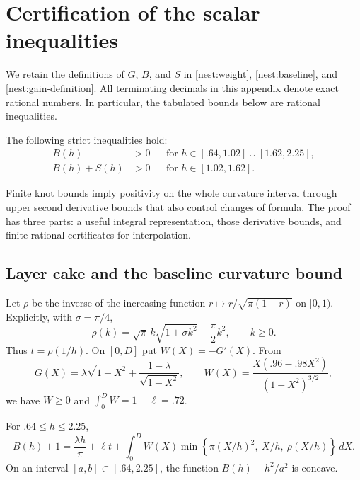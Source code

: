 \section{Certification of the scalar inequalities}
\label{num:section}

We retain the definitions of $G$, $B$, and $S$ in
\eqref{nest:weight}, \eqref{nest:baseline}, and
\eqref{nest:gain-definition}. All terminating decimals in this appendix
denote exact rational numbers. In particular, the tabulated bounds below
are rational inequalities.

\begin{proposition}\label{num:scalar-positive}
The following strict inequalities hold:
\begin{align*}
 B(h)&>0 &&\text{for }h\in[.64,1.02]\cup[1.62,2.25],\\
 B(h)+S(h)&>0 &&\text{for }h\in[1.02,1.62].
\end{align*}
\end{proposition}

Finite knot bounds imply positivity on the whole curvature interval
through upper second derivative bounds that also control changes of formula.
The proof has three parts: a useful integral representation, those
derivative bounds, and finite rational certificates for interpolation.

\subsection{Layer cake and the baseline curvature bound}

Let $\rho$ be the inverse of the increasing function
$r\mapsto r/\sqrt{\pi(1-r)}$ on $[0,1)$. Explicitly, with $\sigma=\pi/4$,
\begin{equation}\label{num:rho}
 \rho(k)=\sqrt\pi\,k\sqrt{1+\sigma k^2}-\frac\pi2 k^2,
 \qquad k\ge0.
\end{equation}
Thus $t=\rho(1/h)$. On $[0,D]$ put $W(X)=-G'(X)$. From
\begin{equation}\label{num:weight-density}
 G(X)=\lambda\sqrt{1-X^2}+\frac{1-\lambda}{\sqrt{1-X^2}},
 \qquad
 W(X)=\frac{X(.96-.98X^2)}{(1-X^2)^{3/2}},
\end{equation}
we have $W\ge0$ and $\int_0^D W=1-\ell=.72$.

\begin{lemma}\label{num:layer-cake}
For $.64\le h\le2.25$,
\begin{equation}\label{num:layer-cake-formula}
 B(h)+1=\frac{\lambda h}{\pi}+\ell t+
 \int_0^D W(X)
 \min\left\{\pi(X/h)^2,\ X/h,\ \rho(X/h)\right\}\,dX.
\end{equation}
On an interval $[a,b]\subset[.64,2.25]$, the function
$B(h)-h^2/a^2$ is concave.
\end{lemma}

